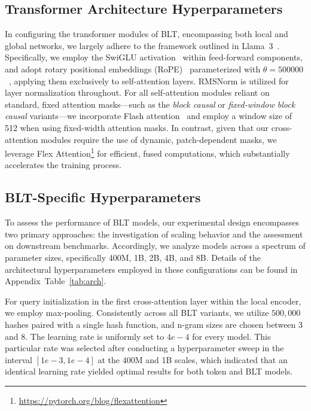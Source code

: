 \subsection{Transformer Architecture Hyperparameters} In configuring the transformer modules of {\textsc BLT}, encompassing both local and global networks, we largely adhere to the framework outlined in Llama~3~\citep{dubey2024llama}. Specifically, we employ the SwiGLU activation~\citep{swiglu} within feed-forward components, and adopt rotary positional embeddings (RoPE)~\citep{RoPe} parameterized with $\theta=500000$~\citep{xiong2024effective}, applying them exclusively to self-attention layers. RMSNorm \citep{RMSNorm} is utilized for layer normalization throughout. For all self-attention modules reliant on standard, fixed attention masks—such as the \textit{block causal} or \textit{fixed-window block causal} variants—we incorporate Flash attention~\citep{dao2022flashattention} and employ a window size of 512 when using fixed-width attention masks. In contrast, given that our cross-attention modules require the use of dynamic, patch-dependent masks, we leverage Flex Attention\footnote{\url{https://pytorch.org/blog/flexattention}} for efficient, fused computations, which substantially accelerates the training process.

\subsection{{\textsc BLT}-Specific Hyperparameters} 

To assess the performance of {\textsc BLT} models, our experimental design encompasses two primary approaches: the investigation of scaling behavior and the assessment on downstream benchmarks. Accordingly, we analyze models across a spectrum of parameter sizes, specifically 400M, 1B, 2B, 4B, and 8B. Details of the architectural hyperparameters employed in these configurations can be found in Appendix~Table~\ref{tab:arch}.

For query initialization in the first cross-attention layer within the local encoder, we employ max-pooling. Consistently across all {\textsc BLT} variants, we utilize $500,000$ hashes paired with a single hash function, and n-gram sizes are chosen between 3 and 8. The learning rate is uniformly set to $4e-4$ for every model. This particular rate was selected after conducting a hyperparameter sweep in the interval $[1e-3, 1e-4]$ at the 400M and 1B scales, which indicated that an identical learning rate yielded optimal results for both token and {\textsc BLT} models.

